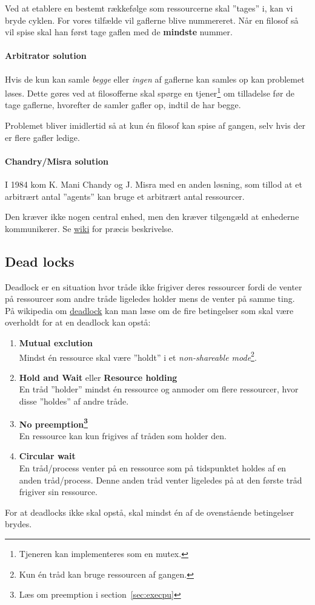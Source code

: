 Ved at etablere en bestemt rækkefølge som ressourcerne skal ''tages'' i, kan vi bryde cyklen. For vores tilfælde vil gaflerne blive nummereret. Når en filosof så vil spise skal han først tage gaflen med de \textbf{mindste} nummer.

\paragraph{Arbitrator solution}
Hvis de kun kan samle \textit{begge} eller \textit{ingen} af gaflerne kan samles op kan problemet løses. Dette gøres ved at filosofferne skal spørge en tjener\footnote{Tjeneren kan implementeres som en mutex.} om tilladelse før de tage gaflerne, hvorefter de samler gafler op, indtil de har begge. 

Problemet bliver imidlertid så at kun én filosof kan spise af gangen, selv hvis der er flere gafler ledige.

\paragraph{Chandry/Misra solution}
I 1984 kom K. Mani Chandy og J. Misra med en anden løsning, som tillod at et arbitrært antal ''agents'' kan bruge et arbitrært antal ressourcer.

Den kræver ikke nogen central enhed, men den kræver tilgengæld at enhederne kommunikerer. Se \href{https://en.wikipedia.org/wiki/Dining_philosophers_problem#Chandy.2FMisra_solution}{wiki} for præcis beskrivelse.

\subsection{Dead locks}\label{sec:deadlock}
Deadlock er en situation hvor tråde ikke frigiver deres ressourcer fordi de venter på ressourcer som andre tråde ligeledes holder mens de venter på samme ting.\\

På wikipedia om \href{https://en.wikipedia.org/wiki/Deadlock}{deadlock} kan man læse om de fire betingelser som skal være overholdt for at en deadlock kan opstå:
\begin{enumerate}
	\item \textbf{Mutual exclution}\\
	Mindst én ressource skal være ''holdt'' i et \textit{non-shareable mode}\footnote{Kun én tråd kan bruge ressourcen af gangen.}.
	\item \textbf{Hold and Wait} eller \textbf{Resource holding}\\
	En tråd ''holder'' mindst én ressource og anmoder om flere ressourcer, hvor disse ''holdes'' af andre tråde.
	\item \textbf{No preemption\footnote{Læs om preemption i section~\ref{sec:execpu}}}\\
	En ressource kan kun frigives af tråden som holder den.
	\item \textbf{Circular wait}\\
	En tråd/process venter på en ressource som på tidspunktet holdes af en anden tråd/process. Denne anden tråd venter ligeledes på at den første tråd frigiver sin ressource.
\end{enumerate}

For at deadlocks ikke skal opstå, skal mindst én af de ovenstående betingelser brydes.
